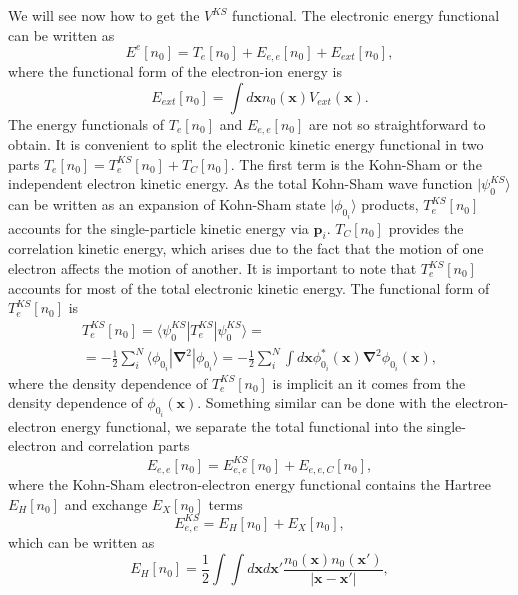 We will see now how to get the $V^{KS}$ functional. The electronic energy functional can be written as
\begin{equation}
 E^{e}[n_{0}]=T_{e}[n_{0}]+E_{e,e}[n_{0}]+E_{ext}[n_{0}],
\end{equation}
where the functional form of the electron-ion energy is
\begin{equation}
 E_{ext}[n_{0}]=\int{d\mathbf{x}n_{0}(\mathbf{x})V_{ext}(\mathbf{x})}.
\end{equation}
The energy functionals of $T_{e}[n_{0}]$ and $E_{e,e}[n_{0}]$ are not so straightforward to obtain. It is convenient to split the electronic kinetic energy functional in two parts 
$T_{e}[n_{0}]=T_{e}^{KS}[n_{0}]+T_{C}[n_{0}]$. The first term is the Kohn-Sham or the independent electron kinetic energy. As the total Kohn-Sham wave function $|\psi_{0}^{KS}\rangle$ can be written as an 
expansion of Kohn-Sham state $|\phi_{0_{i}}\rangle$ products, $T_{e}^{KS}[n_{0}]$ accounts for the single-particle kinetic energy via $\mathbf{p}_{i}$. $T_{C}[n_{0}]$ provides the correlation kinetic energy, which 
arises due to the fact that the motion of one electron affects the motion of another. It is important to note that $T_{e}^{KS}[n_{0}]$ accounts for most of the total electronic kinetic energy. The functional form of 
$T_{e}^{KS}[n_{0}]$ is
\begin{multline}
 T_{e}^{KS}[n_{0}]=\langle\psi_{0}^{KS}|T_{e}^{KS}|\psi_{0}^{KS}\rangle= \\ =-\frac{1}{2}\sum_{i}^{N}\langle\phi_{0_{i}}|\boldsymbol{\nabla}^{2}|\phi_{0_{i}}\rangle=-\frac{1}{2}\sum_{i}^{N}\int{d\mathbf{
 x}\phi_{0_{i}}^{*}(\mathbf{x})\boldsymbol{\nabla}^{2}\phi_{0_{i}}(\mathbf{x})},
\end{multline}
where the density dependence of $T_{e}^{KS}[n_{0}]$ is implicit an it comes from the density dependence of $\phi_{0_{i}}(\mathbf{x})$. Something similar can be done with the electron-electron energy functional, we 
separate the total functional into the single-electron and correlation parts
\begin{equation}
 E_{e,e}[n_{0}]=E_{e,e}^{KS}[n_{0}]+E_{e,e,C}[n_{0}],
\end{equation}
where the Kohn-Sham electron-electron energy functional contains the Hartree $E_{H}[n_{0}]$ and exchange $E_{X}[n_{0}]$ terms
\begin{equation}
 E_{e,e}^{KS}=E_{H}[n_{0}]+E_{X}[n_{0}],
\end{equation}
which can be written as
\begin{equation}
 E_{H}[n_{0}]=\frac{1}{2}\int{\int{d\mathbf{x}d\mathbf{x}'\frac{n_{0}(\mathbf{x})n_{0}(\mathbf{x}')}{|\mathbf{x}-\mathbf{x}'|}}},
\end{equation}
